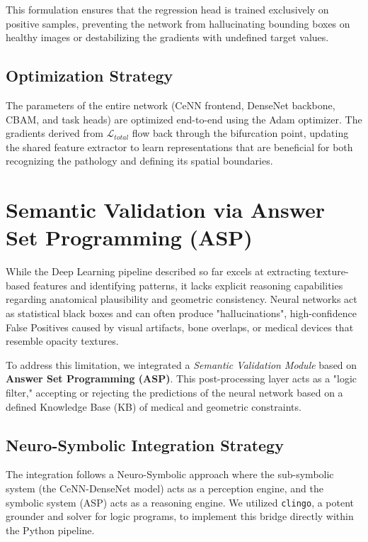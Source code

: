 \documentclass[a4paper,fleqn]{cas-dc}
\begin{document}
This formulation ensures that the regression head is trained exclusively on positive samples, preventing the network from hallucinating bounding boxes on healthy images or destabilizing the gradients with undefined target values.

\subsection{Optimization Strategy}
The parameters of the entire network (CeNN frontend, DenseNet backbone, CBAM, and task heads) are optimized end-to-end using the Adam optimizer. The gradients derived from $\mathcal{L}_{total}$ flow back through the bifurcation point, updating the shared feature extractor to learn representations that are beneficial for both recognizing the pathology and defining its spatial boundaries.
	
\section{Semantic Validation via Answer Set Programming (ASP)}
\label{sec:asp_methodology}

While the Deep Learning pipeline described so far excels at extracting texture-based features and identifying patterns, it lacks explicit reasoning capabilities regarding anatomical plausibility and geometric consistency. Neural networks act as statistical black boxes and can often produce "hallucinations", high-confidence False Positives caused by visual artifacts, bone overlaps, or medical devices that resemble opacity textures.

To address this limitation, we integrated a \textit{Semantic Validation Module} based on \textbf{Answer Set Programming (ASP)}. This post-processing layer acts as a "logic filter," accepting or rejecting the predictions of the neural network based on a defined Knowledge Base (KB) of medical and geometric constraints.

\subsection{Neuro-Symbolic Integration Strategy}
The integration follows a Neuro-Symbolic approach where the sub-symbolic system (the CeNN-DenseNet model) acts as a perception engine, and the symbolic system (ASP) acts as a reasoning engine. We utilized \texttt{clingo}\cite{gebser2018multishotaspsolvingclingo}, a potent grounder and solver for logic programs, to implement this bridge directly within the Python pipeline.
\end{document}
